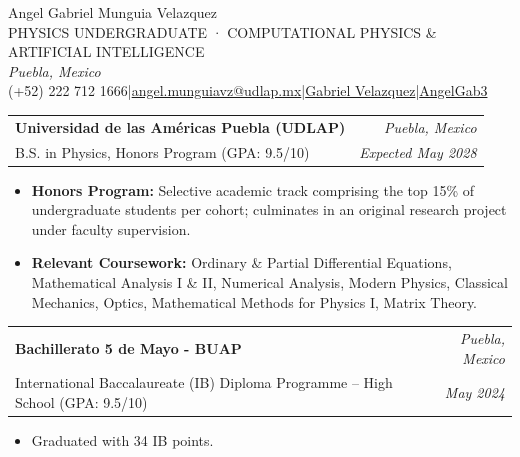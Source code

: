 \documentclass[a4paper,11pt]{article}
\makeatletter
\newcommand{\cvsection}[1]{\par\Needspace{5\baselineskip}\vspace{9pt}{\fontsize{14}{16}\selectfont\bfseries\color{black}#1\enspace\leaders\hrule height .6pt\hfill\kern0pt}\par\vspace{5pt}}
\renewcommand{\section}[1]{\cvsection{#1}}
\renewcommand{\small}{\fontsize{9}{11}\selectfont}
\newcommand{\resumeSubHeadingListStart}{}
\newcommand{\resumeSubHeadingListEnd}{}
\newcommand{\resumeSubheading}[4]{\par\Needspace{5\baselineskip}\vspace{4pt}\begin{tabularx}{\textwidth}{@{}X r@{}}{\fontsize{10}{12}\selectfont\bfseries #1}&{\fontsize{9}{11}\selectfont\itshape #2}\\{\fontsize{9}{11}\selectfont #3}&{\fontsize{8}{10}\selectfont\itshape #4}\end{tabularx}\par}
\newcommand{\resumeItemListStart}{\begin{itemize}[leftmargin=11pt,label=\textbullet,itemsep=1pt,topsep=3pt,parsep=0pt]}
\newcommand{\resumeItemListEnd}{\end{itemize}}
\newcommand{\resumeItem}[1]{\item #1}
\makeatother
\begin{document}
\fontsize{9}{11}\selectfont
\begin{center}
{\headerfont\fontsize{20}{24}\selectfont Angel Gabriel Munguia Velazquez}\\[4pt]
{\fontsize{8}{10}\selectfont PHYSICS UNDERGRADUATE · COMPUTATIONAL PHYSICS \& ARTIFICIAL INTELLIGENCE}\\[4pt]
{\fontsize{8}{10}\selectfont\itshape\color{graytext}Puebla, Mexico}\\[5pt]
{\fontsize{7.5}{10}\selectfont \faPhone\enspace (+52) 222 712 1666\quad|\quad\href{mailto:angel.munguiavz@udlap.mx}{\faEnvelope\enspace angel.munguiavz@udlap.mx}\quad|\quad\href{https://www.linkedin.com/in/ángel-gabriel-munguía-velázquez-53806930a}{\faLinkedin\enspace Gabriel Velazquez}\quad|\quad\href{https://github.com/AngelGab3}{\faGithub\enspace AngelGab3}}
\end{center}
\section{Profile}
\small{Physics undergraduate at Universidad de las Américas Puebla (UDLAP), driven by curiosity about how computation can help us understand the natural world. Interested in computational physics, machine learning, and quantum computing, with hands-on experience implementing deep learning models, designing experimental setups, and coordinating hardware–software integration. Seeking research opportunities to develop computational methods and models that help explain complex systems, interpret scientific data, and deepen our understanding of the underlying physical processes.}


\section{Education}
  \resumeSubHeadingListStart
    \resumeSubheading
      {Universidad de las Américas Puebla (UDLAP)}{Puebla, Mexico}
      {B.S. in Physics, Honors Program (GPA: 9.5/10)}{Expected May 2028}
      \resumeItemListStart
        \resumeItem{\textbf{Honors Program:} Selective academic track comprising the top 15\% of undergraduate students per cohort; culminates in an original research project under faculty supervision.}
        \resumeItem{\textbf{Relevant Coursework:} Ordinary \& Partial Differential Equations, Mathematical Analysis I \& II, Numerical Analysis, Modern Physics, Classical Mechanics, Optics, Mathematical Methods for Physics I, Matrix Theory.}
      \resumeItemListEnd
    \resumeSubheading
  {Bachillerato 5 de Mayo - BUAP}{Puebla, Mexico}
  {International Baccalaureate (IB) Diploma Programme -- High School (GPA: 9.5/10)}{May 2024}
  \resumeItemListStart
    \resumeItem{Graduated with 34 IB points.}
  \resumeItemListEnd
  \resumeSubHeadingListEnd
\end{document}
